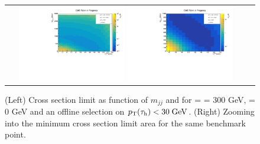 \begin{figure}[tbh!]
	\centering
	\begin{tabular}{cc}
		\includegraphics[width=0.45\textwidth]{analysis/pics/JetInvMass_vs_MET_xsec_chi300_lsp000_taupt30.pdf}
		\includegraphics[width=0.45\textwidth]{analysis/pics/JetInvMass_vs_MET_xsec_chi300_lsp000_taupt30_zoom.pdf} 		
	\end{tabular}
	\caption{(Left) Cross section limit as function of $m_{jj}$ and \met for \charginopm = \neutralinotwo = 300 GeV, \neutralinoone = 0 GeV and an offline selection on $p_{\text{T}}(\tau_{\text{h}}) <  30\;\text{Ge}\kern-0.06667em\text{V}$. (Right) Zooming into the minimum cross section limit area for the same benchmark point.}
	\label{fig::JetInvMass_vs_MET_xsec_chi300_lsp000_taupt30}
\end{figure}

